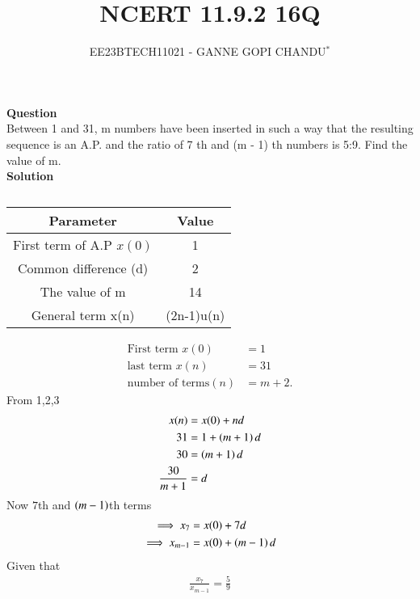 \documentclass[journal,12pt,twocolumn]{IEEEtran}
\theoremstyle{remark}
\begin{document}

\vspace{3cm}
\title{NCERT 11.9.2 16Q}
\author{EE23BTECH11021 - GANNE GOPI CHANDU$^{*}$%
}
\maketitle
\newpage
\bigskip
\renewcommand{\thefigure}{\theenumi}
\renewcommand{\thetable}{\theenumi}

\textbf{Question}\\
Between 1 and 31, m numbers have been inserted in such a way that the resulting sequence is an A.P. and 
the ratio of 7
th and (m - 1)
th numbers is 5:9. Find the value of m.\\
\textbf{Solution}\\
\begin{table}[h!]
\begin{center}
\renewcommand\thetable{1}
\begin{tabular}{ |c|c|  } 
  \hline
    Parameter & Value  \\ 
  \hline
  First term of A.P $x(0)$ & 1  \\ 
  \hline
  Common difference (d) & 2 \\ 
  \hline
  The value of m & 14 \\
  \hline
  General term x(n) & (2n-1)u(n)\\
  \hline
\end{tabular}
\end{center}
\caption{}
\end{table}
\begin{align}
\text{First term } x(0) &= 1\\
\text{last term } x(n) &= 31\\
\text{number of terms}( n) &= m + 2.
\end{align}
From 1,2,3
\begin{align}
x(n)&=x(0)+nd\\
31 &= 1 + \left(m + 1\right)d \\
30 &= \left(m + 1\right)d \\
\frac{30}{m + 1} &= d 
\end{align}
Now $7$th and $\left(m-1\right)$th terms
\begin{align}
\implies x_7 &= x(0) + 7d   \\ 
\implies x_{m-1} &= x(0) + \left(m-1\right)d  
\end{align}
Given that
\begin{align}
\frac{x_{7}}{x_{m-1}} = \frac{5}{9} 
\end{align}
\end{document}
